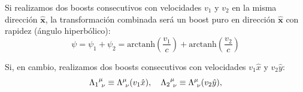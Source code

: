 \documentclass[]{article}
\numberwithin{equation}{section}
\begin{document}

Si realizamos dos boosts consecutivos con velocidades $v_1$ y $v_2$ en la misma dirección $\mathbf{\hat{x}}$, la transformación combinada será un boost puro en dirección $\mathbf{\hat{x}}$ con rapidez (ángulo hiperbólico):
\begin{equation}
	\psi = \psi_1 + \psi_2 = \text{arctanh}\left(\frac{v_1}{c}\right) + \text{arctanh}\left(\frac{v_2}{c}\right) 
\end{equation}


Si, en cambio, realizamos dos boosts consecutivos con velocidades \(v_1\hat{x}\) y \(v_2\hat{y}\):
\begin{equation}
	\indUpDown[\Lambda_1] \equiv \LambdaMuNu(v_1\hat{x}),\ \ \ \indUpDown[\Lambda_2] \equiv \LambdaMuNu(v_2\hat{y}),
\end{equation}
\end{document}
